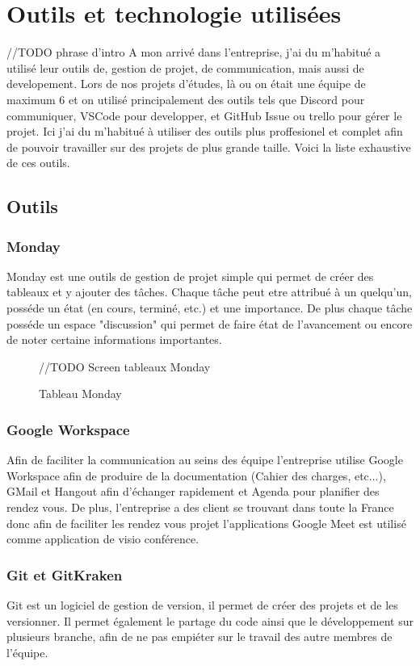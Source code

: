 \section{Outils et technologie utilisées}

//TODO phrase d'intro
A mon arrivé dans l'entreprise, j'ai du m'habitué a utilisé leur outils de, gestion de projet, de communication, mais aussi de developement. Lors de nos projets d'études, là ou on était une équipe de maximum 6 et on utilisé principalement des outils tels que Discord pour communiquer, VSCode pour developper, et GitHub Issue ou trello pour gérer le projet. Ici j'ai du m'habitué à utiliser des outils plus proffesionel et complet afin de pouvoir travailler sur des projets de plus grande taille. Voici la liste exhaustive de ces outils. 
\subsection{Outils}

\subsubsection{Monday}

Monday est une outils de gestion de projet simple qui permet de créer des tableaux et y ajouter des tâches.
Chaque tâche peut etre attribué à un quelqu'un, posséde un état (en cours, terminé, etc.) et une importance.
De plus chaque tâche posséde un espace "discussion" qui permet de faire état de l'avancement ou encore de noter certaine informations importantes. 

\begin{figure}[htbp]
    \center
    //TODO Screen tableaux Monday
    \caption{Tableau Monday}
\end{figure}

\subsubsection{Google Workspace}
Afin de faciliter la communication au seins des équipe l'entreprise utilise Google Workspace afin de produire de la documentation (Cahier des charges, etc...), GMail et Hangout afin d'échanger rapidement et Agenda pour planifier des rendez vous.
De plus, l'entreprise a des client se trouvant dans toute la France donc afin de faciliter les rendez vous projet l'applications Google Meet est utilisé comme application de visio conférence. 

\subsubsection{Git et GitKraken}
Git est un logiciel de gestion de version, il permet de créer des projets et de les versionner. Il permet également le partage du code ainsi que le développement sur plusieurs branche, afin de ne pas empiéter sur le travail des autre membres de l'équipe.

